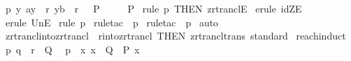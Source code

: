\begin{isabellebody}
\ p{}{\isacharcolon}\ {\isachardoublequoteopen}{\isacharbang}{\isacharbang}y{\isachardot}{\isacharbrackleft}{\isacharbar}\ {\isacharparenleft}a{\isacharcomma}y{\isacharparenright}\ {\isacharcolon}\ r{\isacharpercent}{\isacharasterisk}{\isacharsemicolon}\ {\isacharparenleft}y{\isacharcomma}b{\isacharparenright}\ {\isacharcolon}\ r\ {\isacharbar}{\isacharbrackright}\ {\isacharequal}{\isacharequal}{\isachargreater}\ P{\isachardoublequoteclose}\ \ \ \isanewline
{}\ \ {\isachardoublequoteopen}P{\isachardoublequoteclose}\isanewline
%
\isadelimproof
%
\endisadelimproof
%
\isatagproof
{}\isamarkupfalse%
\ {\isacharparenleft}rule\ p{}\ {\isacharbrackleft}THEN\ zrtranclE{}{\isacharbrackright}{\isacharparenright}\isanewline
{}\isamarkupfalse%
\ {\isacharparenleft}erule\ idZE{\isacharparenright}\ \isanewline
{}\isamarkupfalse%
\ {\isacharparenleft}erule\ UnE{\isacharparenright}\isanewline
{}\isamarkupfalse%
\ {\isacharparenleft}rule\ p{}{\isacharparenright}\isanewline
{}\isamarkupfalse%
\ {\isacharparenleft}rule{\isacharunderscore}tac\ {\isacharbrackleft}{}{\isacharbrackright}\ p{}{\isacharparenright}\isanewline
{}\isamarkupfalse%
\ {\isacharparenleft}rule{\isacharunderscore}tac\ {\isacharbrackleft}{}{\isacharbrackright}\ p{}{\isacharparenright}\isanewline
{}\isamarkupfalse%
\ auto\isanewline
{}\isamarkupfalse%
%
\endisatagproof
{\isafoldproof}%
%
\isadelimproof
\isanewline
%
\endisadelimproof
\isanewline
\isanewline
{}\isamarkupfalse%
\ zrtrancl{\isacharunderscore}into{\isacharunderscore}zrtrancl{}\ {\isacharequal}\ r{\isacharunderscore}into{\isacharunderscore}zrtrancl\ {\isacharbrackleft}THEN\ zrtrancl{\isacharunderscore}trans{\isacharcomma}\ standard{\isacharbrackright}\isanewline
\isanewline
{}\isamarkupfalse%
\ reach{\isacharunderscore}induct{\isacharcolon}\isanewline
{}\ p{}{\isacharcolon}\ {\isachardoublequoteopen}q\ {\isacharcolon}\ {\isacharparenleft}r{\isacharpercent}{\isacharasterisk}{\isacharparenright}\ {\isacharparenleft}{\isacharbar}\ Q\ {\isacharbar}{\isacharparenright}{\isachardoublequoteclose}\isanewline
{}\ p{}{\isacharcolon}\ {\isachardoublequoteopen}{\isacharbang}{\isacharbang}\ x{\isachardot}\ x\ {\isacharcolon}\ Q\ {\isacharequal}{\isacharequal}{\isachargreater}\ P\ x{\isachardoublequoteclose}\isanewline

\end{isabellebody}
